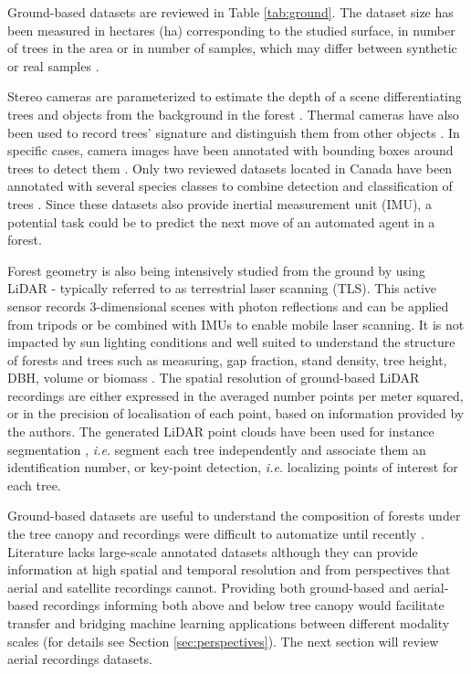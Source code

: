 \documentclass{CUP-JNL-DTM}%
\newcommand{\AOc}[1]{\textcolor{cyan}{[\textbf{Art}: #1]}}
\theoremstyle{definition}
\numberwithin{equation}{section}
\begin{document}
Ground-based datasets are reviewed in Table \ref{tab:ground}. The dataset size has been measured in hectares (ha) corresponding to the studied surface, in number of trees in the area or in number of samples, which may differ between synthetic or real samples \cite{grondin_tree_2022}.

Stereo cameras are parameterized to estimate the depth of a scene differentiating trees and objects from the background in the forest \cite{grondin_tree_2022}. 
Thermal cameras have also been used to record trees' signature \cite{still_thermal_2019} and distinguish them from other objects \cite{da_silva_visible_2021, da_silva_unimodal_2021, da_silva_edge_2022, reis_forest_2020}.
In specific cases, camera images have been annotated with bounding boxes around trees to detect them \cite{tremblay_automatic_2020, grondin_tree_2022}.
Only two reviewed datasets located in Canada have been annotated with several species classes to combine detection and classification of trees \cite{tremblay_automatic_2020, grondin_tree_2022}.
%
Since these datasets also provide inertial measurement unit (IMU), a potential task could be to predict the next move of an automated agent in a forest.

Forest geometry is also being intensively studied from the ground by using LiDAR - typically referred to as terrestrial laser scanning (TLS). This active sensor records 3-dimensional scenes with photon reflections and can be applied from tripods or be combined with IMUs to enable mobile laser scanning. %
It is not impacted by sun lighting conditions and well suited to understand the structure of forests and trees such as measuring, gap fraction, stand density, tree height, DBH, volume or biomass \cite{hackenberg_simpletree_2015, liang_terrestrial_2016, tremblay_automatic_2020}. The spatial resolution of ground-based LiDAR recordings are either expressed in the averaged number points per meter squared, or in the precision of localisation of each point, based on information provided by the authors.
%
The generated LiDAR point clouds have been used for instance segmentation \cite{burt_extracting_2018, tremblay_automatic_2020, grondin_tree_2022}, \textit{i.e.} segment each tree independently and associate them an identification number, or key-point detection, \textit{i.e.} localizing points of interest for each tree. 
%

Ground-based datasets are useful to understand the composition of forests under the tree canopy and recordings were difficult to automatize until recently \cite{calders_strucnet_2023}.
Literature lacks large-scale annotated datasets although they can provide information at high spatial and temporal resolution and from perspectives that aerial and satellite recordings cannot. 
Providing both ground-based and aerial-based recordings \cite{soltani_transfer_2022} informing both above and below tree canopy would facilitate transfer and bridging machine learning applications between different modality scales (for details see Section \ref{sec:perspectives}).
The next section will review aerial recordings datasets.
\end{document}
